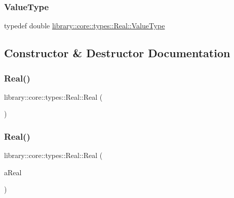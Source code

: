 \subsubsection{\texorpdfstring{Value\+Type}{ValueType}}
{\footnotesize\ttfamily typedef double \hyperlink{classlibrary_1_1core_1_1types_1_1_real_a9c5c8826b7e5a8e39544d23fea6c0e1c}{library\+::core\+::types\+::\+Real\+::\+Value\+Type}}



\subsection{Constructor \& Destructor Documentation}
\mbox{\label{classlibrary_1_1core_1_1types_1_1_real_a664a212a24c7016016a27cf2320a94c1}} 
\subsubsection{\texorpdfstring{Real()}{Real()}\hspace{0.1cm}{\footnotesize\ttfamily [1/2]}}
{\footnotesize\ttfamily library\+::core\+::types\+::\+Real\+::\+Real (\begin{DoxyParamCaption}{ }\end{DoxyParamCaption})\hspace{0.3cm}{\ttfamily [delete]}}

\mbox{\label{classlibrary_1_1core_1_1types_1_1_real_ab25a7f4966c2a2b8facf905a441ad5b5}} 
\subsubsection{\texorpdfstring{Real()}{Real()}\hspace{0.1cm}{\footnotesize\ttfamily [2/2]}}
{\footnotesize\ttfamily library\+::core\+::types\+::\+Real\+::\+Real (\begin{DoxyParamCaption}\item[{\hyperlink{classlibrary_1_1core_1_1types_1_1_real_a9c5c8826b7e5a8e39544d23fea6c0e1c}{Real\+::\+Value\+Type}}]{a\+Real }\end{DoxyParamCaption})}



